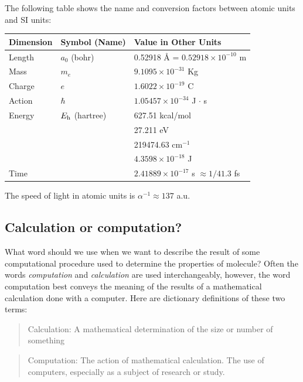 \documentclass[../Main/chem371-notes.tex]{subfiles}
\begin{document}
The following table shows the name and conversion factors between atomic units and SI units:
\begin{table}[htbp]
\centering
\begin{tabular}{lll}
\toprule
Dimension & Symbol (Name) & Value in Other Units\\
\midrule
Length & $a_0$ (bohr) & 0.52918 \AA{}  = $0.52918 \times 10^{-10}$ m\\ 
Mass & $m_e$ & $9.1095 \times 10^{-31}$ Kg \\
Charge & $e$ & $1.6022 \times 10^{-19}$ C \\
Action & $\hbar$ & $1.05457 \times 10^{-34}$ J $\cdot$ s \\
Energy & $E_{\rm h}$ (hartree) & 627.51 kcal/mol \\
& & 27.211 eV \\
& & 219474.63 cm$^{-1}$ \\
& & $4.3598 \times 10^{-18}$ J\\
Time & & $2.41889 \times 10^{-17}$ s $\approx 1/41.3$ fs\\
\bottomrule
\end{tabular}
\label{tab:atomicunits}
\end{table}

The speed of light in atomic units is $\alpha^{-1}\approx 137$ a.u.

\begin{aside}
\section*{Calculation or computation?}
What word should we use when we want to describe the result of some computational procedure used to determine the properties of molecule?
Often the words \emph{computation} and \emph{calculation} are used interchangeably, however, the word computation best conveys the meaning of the results of a mathematical calculation done with a computer. Here are dictionary definitions of these two terms:
\begin{quote}
Calculation: A mathematical determination of the size or number of something
\end{quote}
\begin{quote}
Computation: The action of mathematical calculation. The use of computers, especially as a subject of research or study.
\end{quote}
\end{aside}
\end{document}
